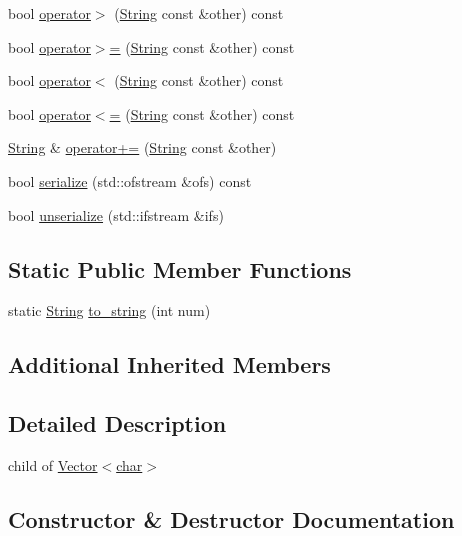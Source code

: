 \begin{DoxyCompactItemize}
\item 
bool \hyperlink{classString_a4b9b4c9eab5759a848229a8209ac3ddf}{operator$>$} (\hyperlink{classString}{String} const \&other) const
\item 
bool \hyperlink{classString_a21e5e59295a87f0af5b082c294c12f11}{operator$>$=} (\hyperlink{classString}{String} const \&other) const
\item 
bool \hyperlink{classString_a223bf46daeb4d9b4a7000feea4d7a6b3}{operator$<$} (\hyperlink{classString}{String} const \&other) const
\item 
bool \hyperlink{classString_a2ee4e8d42626851256a5432bf838d5f9}{operator$<$=} (\hyperlink{classString}{String} const \&other) const
\item 
\hyperlink{classString}{String} \& \hyperlink{classString_acdfa6ad1771ff7c9f9a9dacc177e6661}{operator+=} (\hyperlink{classString}{String} const \&other)
\item 
bool \hyperlink{classString_a05ec329796015f98719b6a924c0f0eb4}{serialize} (std\+::ofstream \&ofs) const
\item 
bool \hyperlink{classString_a66de7cb14dd606a96dbe3fa8b6aff065}{unserialize} (std\+::ifstream \&ifs)
\end{DoxyCompactItemize}
\subsection*{Static Public Member Functions}
\begin{DoxyCompactItemize}
\item 
static \hyperlink{classString}{String} \hyperlink{classString_a52f9352ece5a5266018539183b0de85c}{to\+\_\+string} (int num)
\end{DoxyCompactItemize}
\subsection*{Additional Inherited Members}


\subsection{Detailed Description}
child of \hyperlink{classVector}{Vector$<$char$>$} 

\subsection{Constructor \& Destructor Documentation}
\mbox{\label{classString_a33582c77a4e6b03f950082593cc57de4}} 
